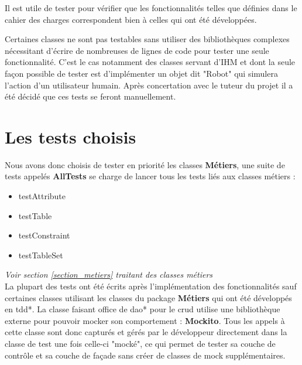 Il est utile de tester pour vérifier que les fonctionnalités telles que définies dans le cahier des charges correspondent bien à celles qui ont été développées.

Certaines classes ne sont pas testables sans utiliser des bibliothèques complexes nécessitant d'écrire de nombreuses de lignes de code pour tester une seule fonctionnalité. C'est le cas notamment des classes servant d'IHM et dont la seule façon possible de tester est d'implémenter un objet dit "Robot" qui simulera l'action d'un utilisateur humain. Après concertation avec le tuteur du projet il a été décidé que ces tests se feront manuellement.

\section{Les tests choisis}

Nous avons donc choisis de tester en priorité les classes \textbf{Métiers}, une suite de tests appelés \textbf{AllTests} se charge  de lancer tous les tests liés aux classes métiers :
\\

\begin{itemize}
	\item testAttribute
	\item testTable
	\item testConstraint
	\item testTableSet
\end{itemize}

\textit{Voir section \ref{section_metiers} traitant des classes métiers}
\\


La plupart des tests ont été écrits après l'implémentation des fonctionnalités sauf certaines classes utilisant les classes du package \textbf{Métiers} qui ont été développés en \gls{tdd}*.
\medbreak
La classe faisant office de \gls{dao}* pour le \gls{crud} utilise une bibliothèque externe pour pouvoir mocker son comportement : \textbf{Mockito}. Tous les appels à cette classe sont donc capturés et gérés par le développeur directement dans la classe de test une fois celle-ci "mocké", ce qui permet de tester sa couche de contrôle et sa couche de façade sans créer de classes de \gls{mock} supplémentaires.

